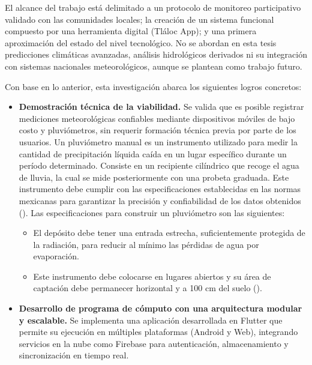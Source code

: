 El alcance del trabajo está delimitado a un protocolo de monitoreo participativo validado con las comunidades locales; la creación de un sistema funcional compuesto por una herramienta digital (Tláloc App); y una primera aproximación del estado del nivel tecnológico. No se abordan en esta tesis predicciones climáticas avanzadas, análisis hidrológicos derivados ni su integración con sistemas nacionales meteorológicos, aunque se plantean como trabajo futuro.

Con base en lo anterior, esta investigación abarca los siguientes logros concretos:

\begin{itemize}
  \item \textbf{Demostración técnica de la viabilidad.} Se valida que es posible registrar mediciones meteorológicas confiables mediante dispositivos móviles de bajo costo y pluviómetros, sin requerir formación técnica previa por parte de los usuarios. Un pluviómetro manual es un instrumento utilizado para medir la cantidad de precipitación líquida caída en un lugar específico durante un período determinado. Consiste en un recipiente cilíndrico que recoge el agua de lluvia, la cual se mide posteriormente con una probeta graduada. Este instrumento debe cumplir con las especificaciones establecidas en las normas mexicanas para garantizar la precisión y confiabilidad de los datos obtenidos (\cite{semarnat_pluviometro}). Las especificaciones para construir un pluviómetro son las siguientes:%
\begin{itemize}
    \item El depósito debe tener una entrada estrecha, suficientemente protegida de la radiación, para reducir al mínimo las pérdidas de agua por evaporación.
    \item Este instrumento debe colocarse en lugares abiertos y su área de captación debe permanecer horizontal y a 100 cm del suelo (\cite{se2013}).
\end{itemize}

  
  \item \textbf{Desarrollo de programa de cómputo con una arquitectura modular y escalable.} Se implementa una aplicación desarrollada en Flutter que permite su ejecución en múltiples plataformas (Android y Web), integrando servicios en la nube como Firebase para autenticación, almacenamiento y sincronización en tiempo real.
  

\end{itemize}
